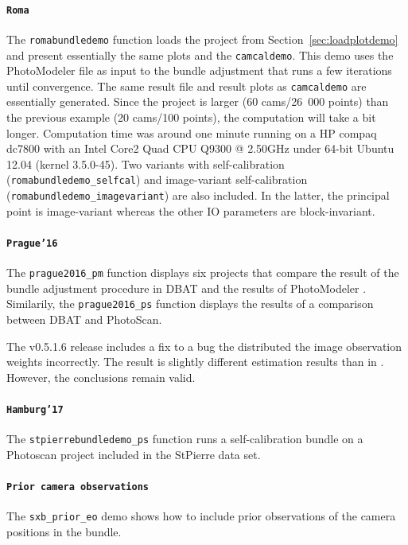 \documentclass{article}
\begin{document}
\paragraph{\texttt{Roma}}
\label{sec:orge252d26}
\sloppy The \texttt{romabundledemo} function loads the project from
Section~\ref{sec:loadplotdemo} and present essentially the same plots and
the \texttt{camcaldemo}. This demo uses the PhotoModeler file as input
to the bundle adjustment that runs a few iterations until convergence.
The same result file and result plots as \texttt{camcaldemo} are
essentially generated. Since the project is larger (60 cams/26~000
points) than the previous example (20 cams/100 points), the
computation will take a bit longer. Computation time was around one
minute running on a HP compaq dc7800 with an Intel Core2 Quad CPU
Q9300 @ 2.50GHz under 64-bit Ubuntu 12.04 (kernel 3.5.0-45). Two
variants with self-calibration (\texttt{romabundledemo\_selfcal}) and
image-variant self-calibration (\texttt{romabundledemo\_imagevariant})
are also included. In the latter, the principal point is image-variant
whereas the other IO parameters are block-invariant.

\paragraph{\texttt{Prague'16}}
\label{sec:org96913d6}
The \texttt{prague2016\_pm} function displays six projects that
compare the result of the bundle adjustment procedure in DBAT and the
results of PhotoModeler \citep{Borlin2016:External}. Similarily, the
\texttt{prague2016\_ps} function displays the results of a comparison
between DBAT and PhotoScan.

The v0.5.1.6 release includes a fix to a bug the distributed the image
observation weights incorrectly. The result is slightly different
estimation results than in \citet{Borlin2016:External}. However, the
conclusions remain valid.

\paragraph{\texttt{Hamburg'17}}
\label{sec:orga608e04}
The \texttt{stpierrebundledemo\_ps} function runs a self-calibration
bundle on a Photoscan project included in the StPierre data set.

\paragraph{\texttt{Prior camera observations}}
\label{sec:orge95db4d}
The \texttt{sxb\_prior\_eo} demo shows how to include prior
observations of the camera positions in the bundle.
\end{document}
